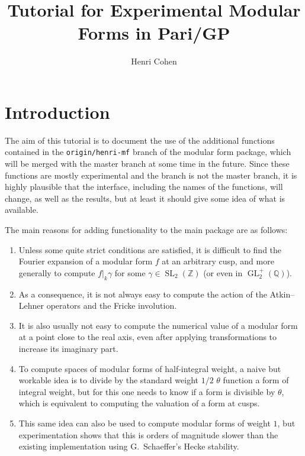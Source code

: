 \documentclass[11pt]{article}
\DeclareMathOperator{\SL}{SL}
\DeclareMathOperator{\GL}{GL}
\newcommand{\Q}{{\mathbb Q}}
\newcommand{\Z}{{\mathbb Z}}
\renewcommand{\th}{\theta}
\begin{document}
\pagestyle{plain}

\title{Tutorial for Experimental Modular Forms in Pari/GP}
\author{Henri Cohen}

\maketitle

\smallskip

\section{Introduction}

The aim of this tutorial is to document the use of the additional functions
contained in the {\tt origin/henri-mf} branch of the modular form package,
which will be merged with the master branch at some time in the future.
Since these functions are mostly experimental and the branch is not the
master branch, it is highly plausible that the interface, including the
names of the functions, will change, as well as the results, but at least
it should give some idea of what is available.

\medskip

The main reasons for adding functionality to the main package are as follows:

\begin{enumerate}
\item Unless some quite strict conditions are satisfied, it is difficult
  to find the Fourier expansion of a modular form $f$ at an arbitrary cusp,
  and more generally to compute $f|_k\gamma$ for some $\gamma\in\SL_2(\Z)$
  (or even in $\GL_2^+(\Q)$).
\item As a consequence, it is not always easy to compute the action of
  the Atkin--Lehner operators and the Fricke involution.
\item It is also usually not easy to compute the numerical value of a
  modular form at a point close to the real axis, even after applying
  transformations to increase its imaginary part.
\item To compute spaces of modular forms of half-integral weight, a
  naive but workable idea is to divide by the standard weight $1/2$
  $\th$ function a form of integral weight, but for this one needs to know
  if a form is divisible by $\th$, which is equivalent to computing the
  valuation of a form at cusps.
\item This same idea can also be used to compute modular forms of weight
  $1$, but experimentation shows that this is orders of magnitude slower
  than the existing implementation using G.~Schaeffer's Hecke stability.
\end{enumerate}
\end{document}
